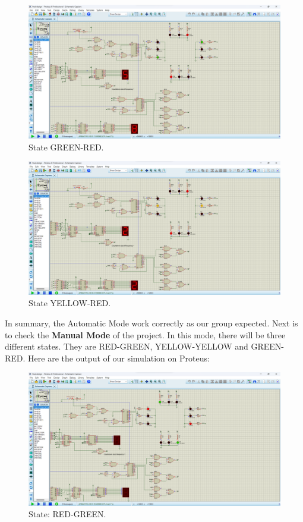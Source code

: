 \documentclass{article}
\begin{document}
\newpage

\begin{figure}[h]
    \centering
    \includegraphics[width=14cm]{Pic/Proteus/Automatic_2.png}
    \caption{State GREEN-RED.}
    \label{fig:enter-label}
\end{figure}

\begin{figure}[h]
    \centering
    \includegraphics[width=14cm]{Pic/Proteus/Automatic_3.png}
    \caption{State YELLOW-RED.}
    \label{fig:enter-label}
\end{figure}

In summary, the Automatic Mode work correctly as our group expected. Next is to check the \textbf{Manual Mode} of the project. In this mode, there will be three different states. They are RED-GREEN, YELLOW-YELLOW and GREEN-RED. Here are the output of our simulation on Proteus:\par
\newpage
\begin{figure}[h]
    \centering
    \includegraphics[width=14cm]{Pic/Proteus/Manual_0.png}
    \caption{State: RED-GREEN.}
    \label{fig:enter-label}
\end{figure}
\end{document}
